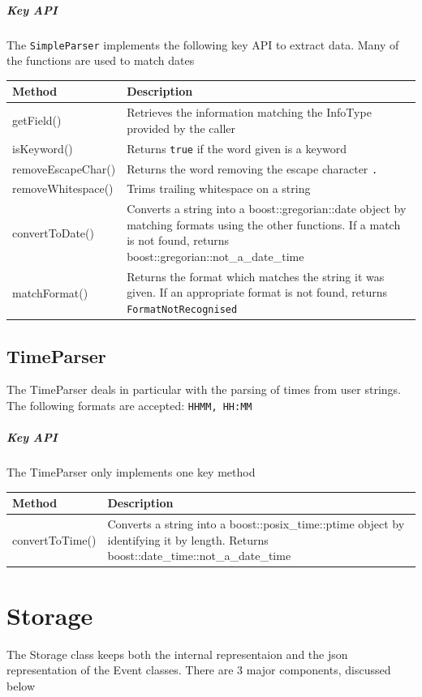 \documentclass[12pt]{extarticle}
\begin{document}
\subparagraph{Key API}The \texttt{SimpleParser} implements the following key API to extract data. Many of the functions are used to match dates\\
\begin{tabular}{p{6cm} p{12cm}}
Method & Description\\
\hline
getField() & Retrieves the information matching the InfoType provided by the caller\\
isKeyword() & Returns \texttt{true} if the word given is a keyword\\
removeEscapeChar() & Returns the word removing the escape character \texttt{.}\\
removeWhitespace() & Trims trailing whitespace on a string\\
convertToDate() & Converts a string into a boost::gregorian::date object by matching formats using the other functions. If a match is not found, returns boost::gregorian::not\_a\_date\_time\\
matchFormat() & Returns the format which matches the string it was given. If an appropriate format is not found, returns \texttt{FormatNotRecognised}\\
\end{tabular}

\subsection{TimeParser}
The TimeParser deals in particular with the parsing of times from user strings. The following formats are accepted: \texttt{HHMM, HH:MM}

\subparagraph{Key API}
The TimeParser only implements one key method\\
\begin{tabular}{p{6cm} p{12cm}}
Method & Description\\
\hline
convertToTime() & Converts a string into a boost::posix\_time::ptime object by identifying it by length. Returns boost::date\_time::not\_a\_date\_time
\end{tabular}

\newpage

\section{Storage}
The Storage class keeps both the internal representaion and the json representation of the Event classes. There are 3 major components, discussed below
\end{document}

